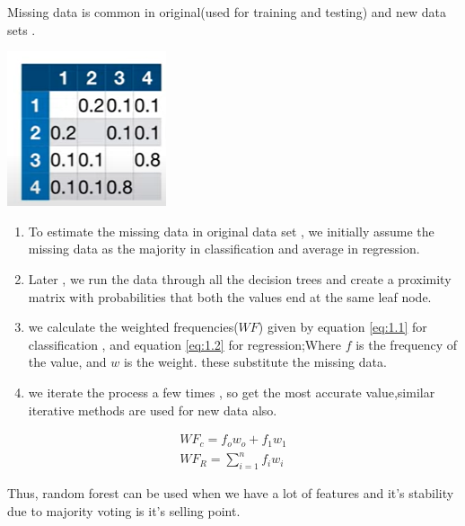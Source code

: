 \documentclass{article}
\begin{document}
  Missing data is common in original(used for training and testing) and new data sets .
  \begin{center}
      

   \includegraphics[scale=1]{proximitymatrix.png}
     \end{center}
  \begin{enumerate}
      \item  To estimate the missing data in original data set , we initially assume the missing data as the majority in classification and average in regression. 
 \item Later , we run the data through all the decision trees and create a proximity matrix with probabilities that both the values end at the same leaf node.

  \item  we calculate the weighted frequencies($WF$) given by equation \eqref{eq:1.1} for classification , and equation \eqref{eq:1.2} for regression;Where $f$ is the frequency of the value, and $w$ is the weight. these substitute the missing data.
  \item we iterate the process a few times , so get the most accurate value,similar iterative methods are used for new data also.
    \end{enumerate}
  \begin{align}
      WF_c=f_ow_o +f_1w_1 \label{eq:1.1} \\
      WF_R=\sum_{i=1}^n f_iw_i \label{eq:1.2}
  \end{align}
  
  Thus, random forest can be used when we have a lot of features and it's stability due to majority voting is it's selling point.
  
\end{document}
